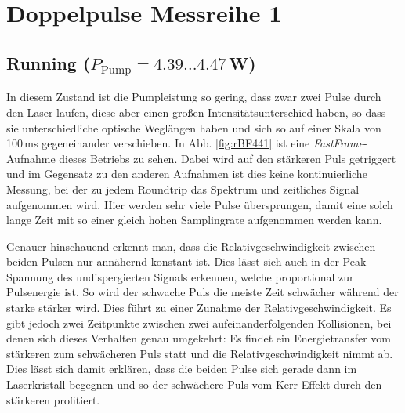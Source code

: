 \documentclass[bachelor,       %
               twoside,        %
               BCOR10mm,       %
               english,ngerman, %
               ]{GAUBM}
\begin{document}
\section{Doppelpulse Messreihe 1}
\subsection{Running ($P_\text{Pump}=4.39\dots4.47\,$W)}
In diesem Zustand ist die Pumpleistung so gering, dass zwar zwei Pulse durch den Laser laufen, diese aber einen großen Intensitätsunterschied haben, so dass sie unterschiedliche optische Weglängen haben und sich so auf einer Skala von 100\,ms gegeneinander verschieben.
In Abb. \ref{fig:rBF441} ist eine \textit{FastFrame}-Aufnahme dieses Betriebs zu sehen.
Dabei wird auf den stärkeren Puls getriggert und im Gegensatz zu den anderen Aufnahmen ist dies keine kontinuierliche Messung, bei der zu jedem Roundtrip das Spektrum und zeitliches Signal aufgenommen wird.
Hier werden sehr viele Pulse übersprungen, damit eine solch lange Zeit mit so einer gleich hohen Samplingrate aufgenommen werden kann.

Genauer hinschauend erkennt man, dass die Relativgeschwindigkeit zwischen beiden Pulsen nur annähernd konstant ist.
Dies lässt sich auch in der Peak-Spannung des undispergierten Signals erkennen, welche proportional zur Pulsenergie ist.
So wird der schwache Puls die meiste Zeit schwächer während der starke stärker wird.
Dies führt zu einer Zunahme der Relativgeschwindigkeit.
Es gibt jedoch zwei Zeitpunkte zwischen zwei aufeinanderfolgenden Kollisionen, bei denen sich dieses Verhalten genau umgekehrt: Es findet ein Energietransfer vom stärkeren zum schwächeren Puls statt und die Relativgeschwindigkeit nimmt ab.
Dies lässt sich damit erklären, dass die beiden Pulse sich gerade dann im Laserkristall begegnen und so der schwächere Puls vom Kerr-Effekt durch den stärkeren profitiert.
\end{document}
